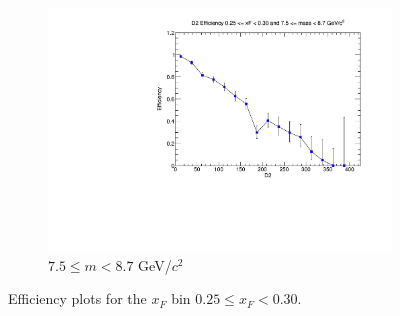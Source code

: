 \begin{figure}[p]
\begin{subfigure}[b]{0.32\textwidth}
        \includegraphics[width=\textwidth]{./kTrackerEfficiencyPlots/D2_Efficiency_xF5_mass10.pdf}
        \caption{$7.5 \leq m < 8.7$ GeV/$c^2$}
        \label{fig:xF5_mass10}
    \end{subfigure}
    \hfill
    \caption{Efficiency plots for the $x_F$ bin $0.25 \leq x_F < 0.30$.}
    \label{fig:xF5}
\end{figure}

\clearpage

